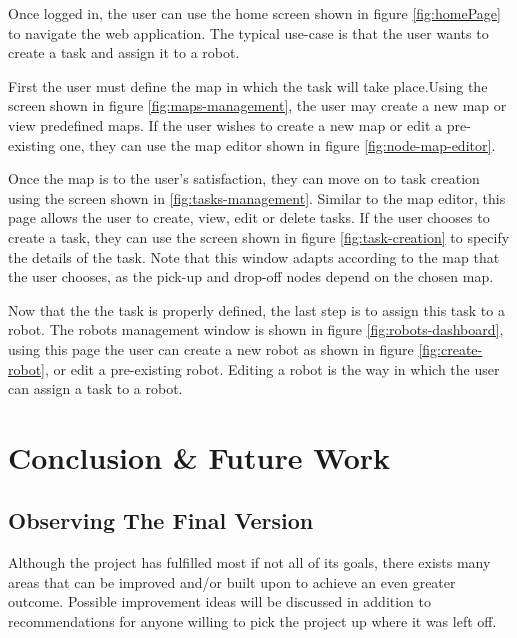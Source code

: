 Once logged in, the user can use the home screen shown in figure \ref{fig:homePage} to navigate the web application. The typical use-case is that the user wants to create a task and assign it to a robot.

First the user must define the map in which the task will take place.Using the screen shown in figure \ref{fig:maps-management}, the user may create a new map or view predefined maps. If the user wishes to create a new map or edit a pre-existing one, they can use the map editor shown in figure \ref{fig:node-map-editor}.

Once the map is to the user's satisfaction, they can move on to task creation using the screen shown in \ref{fig:tasks-management}. Similar to the map editor, this page allows the user to create, view, edit or delete tasks. If the user chooses to create a task, they can use the screen shown in figure \ref{fig:task-creation} to specify the details of the task. Note that this window adapts according to the map that the user chooses, as the pick-up and drop-off nodes depend on the chosen map.

Now that the the task is properly defined, the last step is to assign this task to a robot. The robots management window is shown in figure \ref{fig:robots-dashboard}, using this page the user can create a new robot as shown in figure \ref{fig:create-robot}, or edit a pre-existing robot. Editing a robot is the way in which the user can assign a task to a robot.
\newpage

\chapter{Conclusion \& Future Work}

\section{Observing The Final Version}

Although the project has fulfilled most if not all of its goals, there exists many areas that can be improved and/or built upon to achieve an even greater outcome. Possible improvement ideas will be discussed in addition to recommendations for anyone willing to pick the project up where it was left off.

